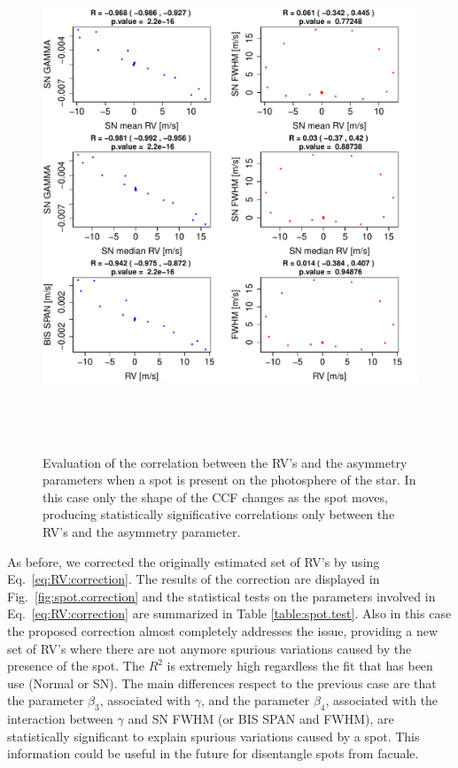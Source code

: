 \documentclass[11pt, oneside]{article}
\begin{document}
\begin{figure}[htbp]
   \centering
\includegraphics[height = 6in]{SOAP_SPOT_Comparison_para_SN.pdf} 
   \caption{Evaluation of the correlation between the RV's and the asymmetry parameters when a spot is present on the photosphere of the star. In this case only the shape of the CCF changes as the spot moves, producing statistically significative correlations only between the RV's and the asymmetry parameter.}
    \label{fig:spot.corr}
\end{figure}

As before, we corrected the originally estimated set of RV's by using Eq.~\ref{eq:RV:correction}. The results of the correction are displayed in Fig.~\ref{fig:spot.correction} and the statistical tests on the parameters involved in Eq.~\ref{eq:RV:correction} are summarized in Table \ref{table:spot.test}. Also in this case the proposed correction almost completely addresses the issue, providing a new set of RV's where there are not anymore spurious variations caused by the presence of the spot. The $R^{2}$ is extremely high regardless the fit that has been use (Normal or SN). The main differences respect to the previous case are that the parameter $\beta_{3}$, associated with $\gamma$, and the parameter $\beta_{4}$, associated with the interaction between $\gamma$ and SN FWHM (or BIS SPAN and FWHM), are statistically significant to explain spurious variations caused by a spot. This information could be useful in the future for disentangle spots from facuale. 
\end{document}
